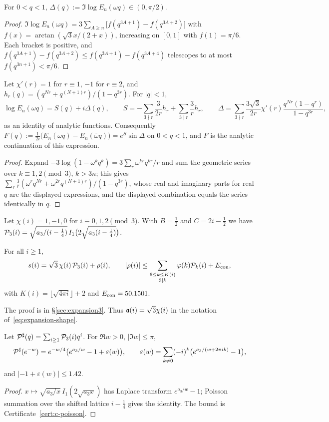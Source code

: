 \begin{lemma}\label{lem:c-tailphase}
For $0<q<1$, $\Delta(q):=\Im\log E_n(\omega q)\in(0,\pi/2)$.
\end{lemma}
\begin{proof}
$\Im\log E_n(\omega q)=3\sum_{A\ge n}\big[f(q^{3A+1})-f(q^{3A+2})\big]$ with $f(x)=\arctan(\sqrt3x/(2+x))$, increasing on
$[0,1]$ with $f(1)=\pi/6$. Each bracket is positive, and $f(q^{3A+1})-f(q^{3A+2})\le f(q^{3A+1})-f(q^{3A+4})$ telescopes
to at most $f(q^{3n+1})<\pi/6$.
\end{proof}

\begin{lemma}\label{lem:c-closed}
Let $\chi'(r)=1$ for $r\equiv1$, $-1$ for $r\equiv2$, and $h_r(q)=(q^{Nr}+q^{(N+1)r})/(1-q^{3r})$. For $|q|<1$,
\[
\log E_n(\omega q)=S(q)+i\Delta(q),\qquad
S=-\sum_{3\nmid r}\frac{3}{2r}h_r+\sum_{3\mid r}\frac3r h_r,\qquad
\Delta=\sum_{3\nmid r}\frac{3\sqrt3}{2r}\chi'(r)\frac{q^{Nr}(1-q^r)}{1-q^{3r}},
\]
as an identity of analytic functions. Consequently $F(q):=\frac1{2i}\big(E_n(\omega q)-E_n(\bar\omega q)\big)=e^{S}\sin\Delta$
on $0<q<1$, and $F$ is the analytic continuation of this expression.
\end{lemma}
\begin{proof}
Expand $-3\log(1-\omega^kq^k)=3\sum_r\omega^{kr}q^{kr}/r$ and sum the geometric series over $k\equiv1,2\pmod3$, $k>3n$;
this gives $\sum_r\frac3r(\omega^rq^{Nr}+\omega^{2r}q^{(N+1)r})/(1-q^{3r})$, whose real and imaginary parts for real $q$
are the displayed expressions, and the displayed combination equals the series identically in $q$.
\end{proof}

Let $\chi(i)=1,-1,0$ for $i\equiv0,1,2\pmod 3$. With $B=\frac12$ and $C=2i-\frac12$ we have
$\mathcal P_3(i)=\sqrt{a_3/(i-\frac14)}\,I_1\big(2\sqrt{a_3(i-\frac14)}\big)$.

\begin{theorem}\label{thm:expansion3}
For all $i\ge1$,
\[
s(i)=\sqrt3\,\chi(i)\,\mathcal P_3(i)+\rho(i),\qquad |\rho(i)|\le\sum_{\substack{6\le k\le K(i)\\3\mid k}}\varphi(k)\mathcal P_k(i)+E_{\mathrm{con}},
\]
with $K(i)=\lfloor\sqrt{4\pi i}\rfloor+2$ and $E_{\mathrm{con}}=50.1501$.
\end{theorem}
The proof is in \S\ref{sec:expansion3}. Thus $\mathfrak a(i)=\sqrt3\chi(i)$ in the notation of~\eqref{eq:expansion-shape}.

\begin{lemma}\label{lem:c-poisson}
Let $\mathcal P^\sharp(q)=\sum_{i\ge1}\mathcal P_3(i)q^i$. For $\Re w>0$, $|\Im w|\le\pi$,
\[
\mathcal P^\sharp(e^{-w})=e^{-w/4}\big(e^{a_3/w}-1+\varepsilon(w)\big),\qquad
\varepsilon(w)=\sum_{k\ne0}(-i)^k\big(e^{a_3/(w+2\pi ik)}-1\big),
\]
and $|{-1}+\varepsilon(w)|\le 1.42$.
\end{lemma}
\begin{proof}
$x\mapsto\sqrt{a_3/x}\,I_1(2\sqrt{a_3x})$ has Laplace transform $e^{a_3/w}-1$; Poisson summation over the shifted lattice
$i-\frac14$ gives the identity. The bound is Certificate~\ref{cert:c-poisson}.
\end{proof}

